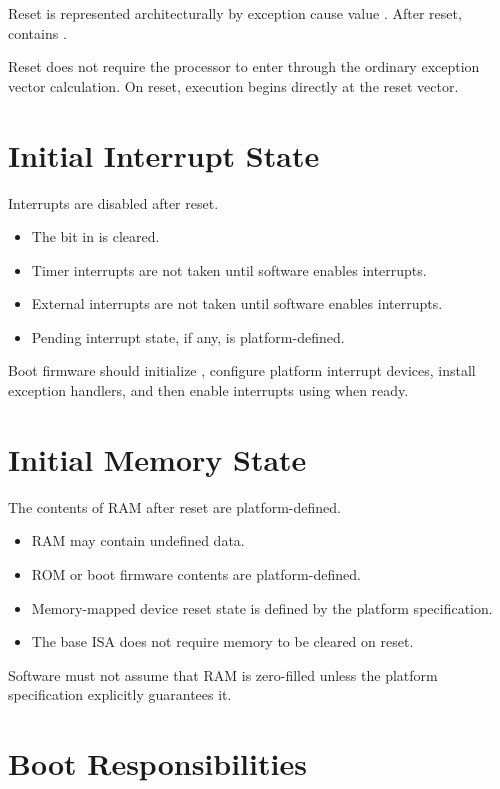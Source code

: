 Reset is represented architecturally by exception cause value .
After reset,  contains .

\noindent
Reset does not require the processor to enter through the ordinary exception
vector calculation. On reset, execution begins directly at the reset vector.

\section{Initial Interrupt State}

Interrupts are disabled after reset.

\begin{itemize}
\item The  bit in  is cleared.
\item Timer interrupts are not taken until software enables interrupts.
\item External interrupts are not taken until software enables interrupts.
\item Pending interrupt state, if any, is platform-defined.
\end{itemize}

\noindent
Boot firmware should initialize , configure platform interrupt devices, install exception handlers, and then enable interrupts using  when ready.

\section{Initial Memory State}

The contents of RAM after reset are platform-defined.

\begin{itemize}
\item RAM may contain undefined data.
\item ROM or boot firmware contents are platform-defined.
\item Memory-mapped device reset state is defined by the platform specification.
\item The base ISA does not require memory to be cleared on reset.
\end{itemize}

\noindent
Software must not assume that RAM is zero-filled unless the platform specification explicitly guarantees it.

\section{Boot Responsibilities}

